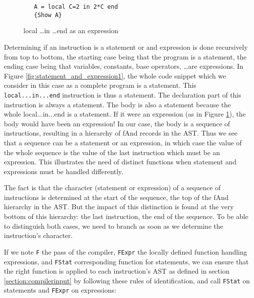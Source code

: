 \documentclass[a4paper]{memoir}
\begin{document}
\begin{figure}[h]
\begin{lstlisting}
   A = local C=2 in 2*C end
   {Show A}
\end{lstlisting}
\caption{local \ldots in \ldots end as an expression}
\label{fig:statement_and_expression2}
\end{figure}

Determining if an instruction is a statement or and expression is done
recursively from top to bottom, the starting case being that the program is a
statement, the ending case being that variables, constants, base operators,
\ldots are expressions.  In Figure \ref{fig:statement_and_expression1}, the
whole code snippet which we consider in this case as a complete program is a
statement. This \lstinline!local...in...end! instruction is thus a statement.
The declaration part of this instruction is always a statement. The body is
also a statement because the whole local...in...end is a statement. If it were
an expression (as in Figure \ref{fig:statement_and_expression2}), the body
would have been an expression! In our case, the body is a sequence of
instructions, resulting in a hierarchy of fAnd records in the AST. Thus we see that a sequence
can be a statement or an expression, in which case the value
of the whole sequence is the value of the last instruction which must be an expression. This illustrates the
need of distinct functions when statement and expressions must be handled
differently. 

The fact is that the character (statement or
expression) of a sequence of instructions is determined at the start of the
sequence, the top of the fAnd hierarchy in the AST. But the impact of this
distinction is found at the very bottom of this hierarchy: the last
instruction, the end of the sequence. To be able to distinguish both cases, we
need to branch as soon as we determine the instruction's character.

If we note \lstinline!F! the pass of the compiler, \lstinline!FExpr! the locally defined
function handling expressions, and \lstinline!FStat! corresponding function for
statements, we can ensure that the right function is applied to each
instruction's AST as defined in section \ref{section:compilerinput} by following
these rules of identification, and call \lstinline!FStat! on statements and
\lstinline!FExpr! on expressions:
\end{document}
